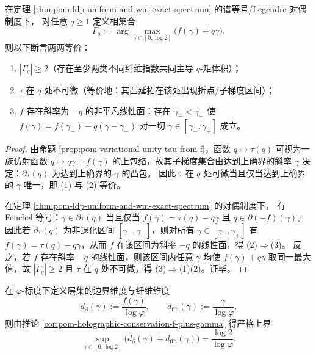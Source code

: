 \begin{proposition}\label{prop:pom-phase-transition-kink-vs-linear-face}
在定理 \ref{thm:pom-ldp-uniform-and-wm-exact-spectrum} 的谱等号/Legendre 对偶制度下，
对任意 \(q\ge 1\) 定义相集合
\[
\Gamma_q:=\arg\max_{\gamma\in[0,\log 2]}\bigl(f(\gamma)+q\gamma\bigr).
\]
则以下断言两两等价：
\begin{enumerate}
  \item \(|\Gamma_q|\ge 2\)（存在至少两类不同纤维指数共同主导 \(q\)-矩体积）；
  \item \(\tau\) 在 \(q\) 处不可微（等价地：其凸延拓在该处出现折点/子梯度区间）；
  \item \(f\) 存在斜率为 \(-q\) 的非平凡线性面：存在 \(\gamma_-<\gamma_+\) 使
  \(
  f(\gamma)=f(\gamma_-)-q(\gamma-\gamma_-)
  \)
  对一切 \(\gamma\in[\gamma_-,\gamma_+]\) 成立。
\end{enumerate}
\end{proposition}
\begin{proof}
由命题 \ref{prop:pom-variational-unity-tau-from-f}，函数 \(q\mapsto\tau(q)\) 可视为一族仿射函数 \(q\mapsto q\gamma+f(\gamma)\) 的上包络，故其子梯度集合由达到上确界的斜率 \(\gamma\) 决定：\(\partial\tau(q)\) 为达到上确界的 \(\gamma\) 的凸包。
因此 \(\tau\) 在 \(q\) 处可微当且仅当达到上确界的 \(\gamma\) 唯一，即 (1) 与 (2) 等价。
\par
在定理 \ref{thm:pom-ldp-uniform-and-wm-exact-spectrum} 的对偶制度下，
有 Fenchel 等号：\(\gamma\in\partial\tau(q)\) 当且仅当 \(f(\gamma)=\tau(q)-q\gamma\) 且 \(q\in\partial(-f)(\gamma)\)。
因此若 \(\partial\tau(q)\) 为非退化区间 \([\gamma_-,\gamma_+]\)，则对所有 \(\gamma\in[\gamma_-,\gamma_+]\) 有
\(
f(\gamma)=\tau(q)-q\gamma
\)，从而 \(f\) 在该区间为斜率 \(-q\) 的线性面，得 (2)\(\Rightarrow\)(3)。
反之，若 \(f\) 存在斜率 \(-q\) 的线性面，则该区间内任意 \(\gamma\) 均使 \(f(\gamma)+q\gamma\) 取同一最大值，故 \(|\Gamma_q|\ge 2\) 且 \(\tau\) 在 \(q\) 处不可微，得 (3)\(\Rightarrow\)(1)(2)。证毕。
\end{proof}

\begin{corollary}\label{cor:pom-holographic-dimension-sum-bound}
在 \(\varphi\)-标度下定义层集的边界维度与纤维维度
\[
d_{\partial}(\gamma):=\frac{f(\gamma)}{\log\varphi},\qquad
d_{\mathrm{fib}}(\gamma):=\frac{\gamma}{\log\varphi}.
\]
则由推论 \ref{cor:pom-holographic-conservation-f-plus-gamma} 得严格上界
\[
\boxed{\;
\sup_{\gamma\in[0,\log 2]}\bigl(d_{\partial}(\gamma)+d_{\mathrm{fib}}(\gamma)\bigr)=\frac{\log 2}{\log\varphi}.\;}
\]
\end{corollary}

